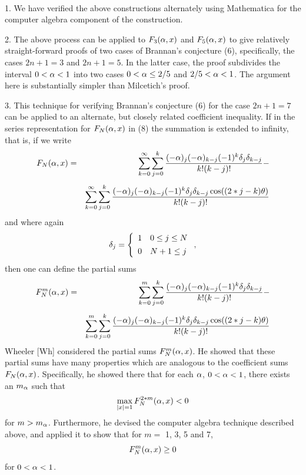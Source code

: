 \\

1.  We have verified the above constructions alternately using
Mathematica for the computer algebra component of the construction.

2.  The above process can be applied to $F_3(\alpha,x)$ and $F_5(\alpha,x)$
to give relatively straight-forward proofs of two cases of Brannan's
conjecture (6), specifically, the cases $2n+1=3$ and $2n+1=5$.  In
the latter case, the proof subdivides the interval $0<\alpha<1$ into two
cases $0<\alpha\leq 2/5$ and $2/5<\alpha<1$.  The argument here is
substantially simpler than Milcetich's proof.

3.  This technique for verifying Brannan's conjecture (6) for the
case $2n+1=7$ can be applied to an alternate, but closely related
coefficient inequality.  If in the series representation for
$F_N(\alpha,x)$ in (8) the summation is extended to infinity, that is, if
we write
\begin{eqnarray}
\nonumber
& F_N(\alpha,x)= & \sum^\infty_{k=0} \sum^k_{j=0} \frac{(-\alpha)_j (-\alpha)_{k-j} 
(-1)^k \delta_j \delta_{k-j}}{k!(k-j)!}-\\[1ex]
\label{15}
&& \sum^\infty_{k=0} \sum^k_{j=0} \frac{(-\alpha)_j (-\alpha)_{k-j} (-1)^k \delta_j 
\delta_{k-j} \cos((2*j-k)\theta)}{k!(k-j)!}
\end{eqnarray}
and where again
$$
\delta_j=\left\{ \begin{array}{ll}1&0\leq j\leq N\\[1ex] 
0&N+1\leq j\end{array}\right. ,
$$
then one can define the partial sums
\begin{eqnarray*}
& F^m_N(\alpha,x)= & \sum^m_{k=0}\sum^k_{j=0}\frac{(-\alpha)_j(-\alpha)_{k-j}
(-1)^k\delta_j\delta_{k-j}}{k!(k-j)!}-\\[1ex]
&& \sum^m_{k=0}\sum^k_{j=0}\frac{(-\alpha)_j(-\alpha)_{k-j}(-1)^k\delta_j\delta_{k-j}
\cos((2*j-k)\theta)}{k!(k-j)!}
\end{eqnarray*}
Wheeler [Wh] considered the partial sums $F^m_N(\alpha,x)$.  He showed
that these partial sums have many properties which are analogous to
the coefficient sums $F_N(\alpha,x)$.  Specifically, he showed there that
for each $\alpha$, $0<\alpha<1$, there exists an $m_\alpha$ such that
$$
\max_{|x|=1}F^{2*m}_N(\alpha,x)<0
$$
for $m>m_\alpha$.  Furthermore, he devised the computer algebra technique
described above, and applied it to show that for $m=$ 1, 3, 5 and 7, 
$$
F^m_N(\alpha,x)\geq 0
$$
for $0<\alpha<1$.

